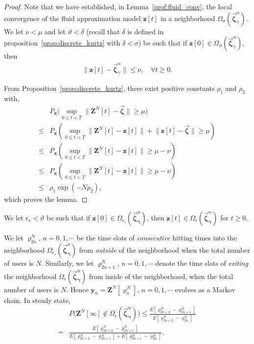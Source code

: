 \documentclass[11pt,twocolumn]{IEEEtran}
\begin{document}
\begin{proof}
Note that we have established, in Lemma~\ref{prof:fluid_conv}, the local convergence of the fluid approximation model $\bm z[t]$ in a neighborhood $\Omega_{\sigma}(\vec{\bm \zeta}^{\alpha}_{\gamma})$. We let $\nu < \mu$ and let $\vartheta<\delta$ (recall that $\delta$ is defined in proposition~\ref{prop:discrete_kurtz} with $\delta<\sigma$) be such that if $\bm z[0] \in \Omega_{\vartheta}(\vec{\bm \zeta}^{\alpha}_{\gamma})$, then
\begin{align}
\nonumber
\|\bm z[t]- \vec{\bm \zeta}^{\alpha}_{\gamma}\| \leq \nu, \quad \forall t\geq 0.
\end{align}

From Proposition~\ref{prop:discrete_kurtz}, there exist positive constants $\rho_1$ and $\rho_2$ with,
\begin{align}
&P_{\bm x}\Big(\sup_{0 \leq t < T} \big\| \bm Z^{{N}}[t]{-}\vec{\bm \zeta} \big\| \geq \mu \Big)\nonumber\\
\leq& P_{\bm x}(\sup_{0 \leq t < T} \big\|\bm Z^{N}[t]{-}\bm z[t]\big\|{+}\big\|\bm z[t] {-} \vec{\bm \zeta}\big\|\geq \mu) \nonumber\\
\leq& P_{\bm x}(\sup_{0 \leq t < T} \big\|\bm Z^{N}[t]{-}\bm z[t]\big\|\geq \mu{-}\nu) \nonumber \\
\leq &  P_{\bm x}(\sup_{0 \leq t < T} \big\|\bm Z^{N}[t]{-}\bm z[t]\big\|\geq \mu{-}\nu) \nonumber \\
\leq &  \rho_1 \exp(-N \rho_2), \nonumber
\end{align}
which proves the lemma.
\end{proof}\vspace{5pt}

We let $\epsilon_s< \vartheta$ be such that if $\bm z[0] \in \Omega_{\epsilon_s}(\vec{\bm \zeta}^{\alpha}_{\bm
\gamma})$, then $\bm z[t] \in \Omega_{\epsilon}(\vec{\bm \zeta}^{\alpha}_{\bm
\gamma})$ for $t\geq 0$.


We let $\varrho^{N}_{2n}$, $n=0,1, \cdots$ be the time slots of \emph{consecutive} hitting times into the neighborhood $\Omega_{\epsilon_s}(\vec{\bm \zeta}^{\alpha}_{\bm
\gamma})$ from \emph{outside} of the neighborhood when the total number of users is $N$. Similarly, we let $\varrho^{N}_{2n+1}$, $n=0,1, \cdots$ denote the time slots of \emph{exiting} the
neighborhood $\Omega_{\epsilon}(\vec{\bm \zeta}^{\alpha}_{\bm
\gamma})$ from inside of the neighborhood, when the total number of users is $N$. Hence $\bm y_n=\bm Z^N[\varrho^{N}_{n}]$, $n=0,1, \cdots$ evolves as a Markov chain. In steady state,
\begin{align}
\label{eq:frac}
&P\big({\bm Z}^{N}[\infty] \notin
\Omega_{\epsilon}(\vec{\bm \zeta}^{\alpha}_{\bm \gamma})\big)\leq\frac{E[\varrho^{N}_{2n+2}-\varrho^{N}_{2n+1}]}{E[\varrho^{N}_{2n+2}-\varrho^{N}_{2n}]}\nonumber\\
=&\frac{E[\varrho^{N}_{2n+2}-\varrho^{N}_{2n+1}]}{E[\varrho^{N}_{2n+2}-\varrho^{N}_{2n+1}]+E[\varrho^{N}_{2n+1}-\varrho^{N}_{2n}]}.
\end{align}
\end{document}
